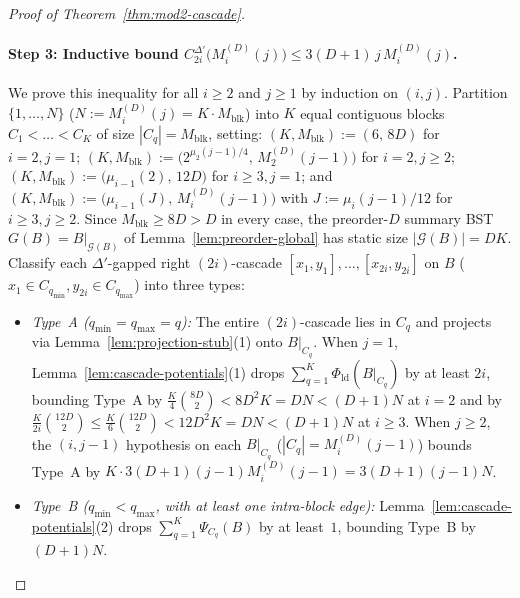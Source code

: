 \documentclass[11pt]{article}
\theoremstyle{definition}
\theoremstyle{remark}
\newcommand{\ld}{\mathrm{ld}}
\begin{document}
\begin{proof}[Proof of Theorem~\ref{thm:mod2-cascade}]
\paragraph{Step 3: Inductive bound $C^{\Delta'}_{2i}\big(M^{(D)}_i(j)\big) \le 3(D + 1)\,j\,M^{(D)}_i(j)$.}
We prove this inequality for all $i \ge 2$ and $j \ge 1$ by induction on $(i, j)$. Partition $\{1, \dots, N\}$ ($N := M^{(D)}_i(j) = K \cdot M_{\mathrm{blk}}$) into $K$ equal contiguous blocks $C_1 < \dots < C_K$ of size $|C_q| = M_{\mathrm{blk}}$, setting: $(K, M_{\mathrm{blk}}) := (6,\, 8D)$ for $i = 2, j = 1$; $(K, M_{\mathrm{blk}}) := \big(2^{\mu_2(j-1)/4},\, M^{(D)}_2(j - 1)\big)$ for $i = 2, j \ge 2$; $(K, M_{\mathrm{blk}}) := \big(\mu_{i-1}(2),\, 12D\big)$ for $i \ge 3, j = 1$; and $(K, M_{\mathrm{blk}}) := \big(\mu_{i-1}(J),\, M^{(D)}_i(j - 1)\big)$ with $J := \mu_i(j - 1)/12$ for $i \ge 3, j \ge 2$. Since $M_{\mathrm{blk}} \ge 8D > D$ in every case, the preorder-$D$ summary BST $G(B) = B|_{\mathcal{G}(B)}$ of Lemma~\ref{lem:preorder-global} has static size $|\mathcal{G}(B)| = D K$. Classify each $\Delta'$-gapped right $(2i)$-cascade $[x_1, y_1], \dots, [x_{2i}, y_{2i}]$ on $B$ ($x_1 \in C_{q_{\min}}, y_{2i} \in C_{q_{\max}}$) into three types:
\begin{itemize}[leftmargin=2em]
  \item \emph{Type~A ($q_{\min} = q_{\max} = q$):} The entire $(2i)$-cascade lies in $C_q$ and projects via Lemma~\ref{lem:projection-stub}(1) onto $B|_{C_q}$. When $j = 1$, Lemma~\ref{lem:cascade-potentials}(1) drops $\sum_{q=1}^K \Phi_{\ld}(B|_{C_q})$ by at least $2i$, bounding Type~A by $\frac{K}{4}\binom{8D}{2} < 8 D^2 K = D N < (D + 1) N$ at $i = 2$ and by $\frac{K}{2i}\binom{12D}{2} \le \frac{K}{6}\binom{12D}{2} < 12 D^2 K = D N < (D + 1) N$ at $i \ge 3$. When $j \ge 2$, the $(i, j - 1)$ hypothesis on each $B|_{C_q}$ ($|C_q| = M^{(D)}_i(j - 1)$) bounds Type~A by $K \cdot 3(D + 1)(j - 1) M^{(D)}_i(j - 1) = 3(D + 1)(j - 1) N$.
  \item \emph{Type~B ($q_{\min} < q_{\max}$, with at least one intra-block edge):} Lemma~\ref{lem:cascade-potentials}(2) drops $\sum_{q=1}^K \Psi_{C_q}(B)$ by at least~$1$, bounding Type~B by $(D + 1) N$.

\end{itemize}
\end{proof}
\end{document}
